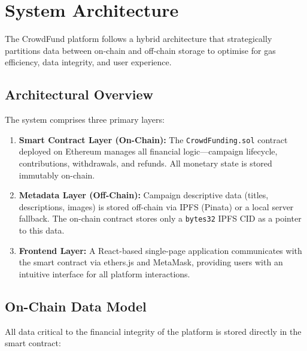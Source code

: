 \section{System Architecture}
\label{sec:architecture}

The CrowdFund platform follows a hybrid architecture that strategically partitions data between on-chain and off-chain storage to optimise for gas efficiency, data integrity, and user experience.

\subsection{Architectural Overview}

The system comprises three primary layers:

\begin{enumerate}[leftmargin=1.5em]
    \item \textbf{Smart Contract Layer (On-Chain):} The \texttt{CrowdFunding.sol} contract deployed on Ethereum manages all financial logic---campaign lifecycle, contributions, withdrawals, and refunds. All monetary state is stored immutably on-chain.
    \item \textbf{Metadata Layer (Off-Chain):} Campaign descriptive data (titles, descriptions, images) is stored off-chain via IPFS (Pinata) or a local server fallback. The on-chain contract stores only a \texttt{bytes32} IPFS CID as a pointer to this data.
    \item \textbf{Frontend Layer:} A React-based single-page application communicates with the smart contract via ethers.js and MetaMask, providing users with an intuitive interface for all platform interactions.
\end{enumerate}

\subsection{On-Chain Data Model}

All data critical to the financial integrity of the platform is stored directly in the smart contract:

